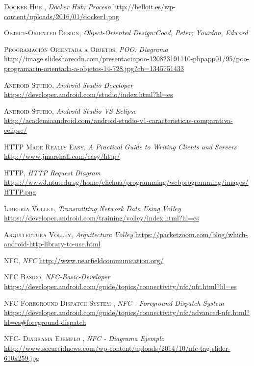 \documentclass[a4paper,11pt]{book}
\begin{document}
\begin{thebibliography}{aaaa}
 \textsc{Docker Hub },
\textit{Docker Hub: Proceso}
\url{http://helloit.es/wp-content/uploads/2016/01/docker1.png}









 \textsc{Object-Oriented Design},
\textit{Object-Oriented Design:Coad, Peter; Yourdon, Edward }
\url{} 

 \textsc{Programación Orientada a Objetos},
\textit{POO: Diagrama }
\url{http://image.slidesharecdn.com/presentacinpoo-120823191110-phpapp01/95/poo-programacin-orientada-a-objetos-14-728.jpg?cb=1345751433} 


 \textsc{Android-Studio},
\textit{Android-Studio-Developer}
\url{https://developer.android.com/studio/index.html?hl=es} 

 \textsc{Android-Studio},
\textit{Android-Studio VS Eclipse}
\url{http://academiaandroid.com/android-studio-v1-caracteristicas-comparativa-eclipse/} 


 \textsc{HTTP Made Really Easy},
\textit{A Practical Guide to Writing Clients and Servers}
\url{http://www.jmarshall.com/easy/http/} 


 \textsc{HTTP},
\textit{HTTP Request Diagram}
\url{https://www3.ntu.edu.sg/home/ehchua/programming/webprogramming/images/HTTP.png} 


 \textsc{Librería Volley},
\textit{Transmitting Network Data Using Volley}
\url{https://developer.android.com/training/volley/index.html?hl=es}

 \textsc{Arquitectura Volley},
\textit{Arquitectura Volley}
\url{https://packetzoom.com/blog/which-android-http-library-to-use.html}

 \textsc{NFC},
\textit{NFC}
\url{http://www.nearfieldcommunication.org/}

 \textsc{NFC Basico},
\textit{NFC-Basic-Developer}
\url{https://developer.android.com/guide/topics/connectivity/nfc/nfc.html?hl=es}

 \textsc{ NFC-Foreground Dispatch System },
\textit{NFC -  Foreground Dispatch System}
\url{https://developer.android.com/guide/topics/connectivity/nfc/advanced-nfc.html?hl=es#foreground-dispatch}


 \textsc{ NFC- Diagrama Ejemplo },
\textit{NFC -  Diagrama Ejemplo}
\url{http://www.secureidnews.com/wp-content/uploads/2014/10/nfc-tag-slider-610x259.jpg}


\end{thebibliography}
\end{document}

